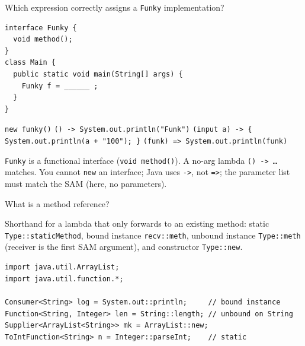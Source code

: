 \question[4]
Which expression correctly assigns a \texttt{Funky} implementation?
\begin{lstlisting}[style=java]
interface Funky {
  void method();
}
class Main {
  public static void main(String[] args) {
    Funky f = ______ ;
  }
}
\end{lstlisting}
\begin{choices}
  \choice \lstinline!new funky()!
  \CorrectChoice \lstinline!() -> System.out.println("Funk")!
  \choice \lstinline!(input a) -> { System.out.println(a + "100"); }!
  \choice \lstinline!(funk) => System.out.println(funk)!
\end{choices}
\begin{solution}
  \texttt{Funky} is a functional interface (\texttt{void method()}). A no-arg lambda \texttt{() -> \ldots} matches. You cannot \texttt{new} an interface; Java uses \texttt{->}, not \texttt{=>}; the parameter list must match the SAM (here, no parameters).
\end{solution}
















\newpage
{}

\question[4]
What is a method reference?
\begin{solutionorbox}[1.15in]
  Shorthand for a lambda that only forwards to an existing method: static \texttt{Type::staticMethod}, bound instance \texttt{recv::meth}, unbound instance \texttt{Type::meth} (receiver is the first SAM argument), and constructor \texttt{Type::new}.

\begin{lstlisting}[style=java]
import java.util.ArrayList;
import java.util.function.*;

Consumer<String> log = System.out::println;     // bound instance
Function<String, Integer> len = String::length; // unbound on String
Supplier<ArrayList<String>> mk = ArrayList::new;
ToIntFunction<String> n = Integer::parseInt;    // static 
\end{lstlisting}
\end{solutionorbox}

